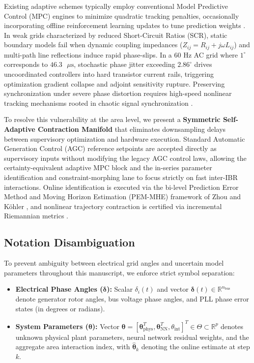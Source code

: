 \documentclass[journal]{IEEEtran}
\begin{document}
Existing adaptive schemes typically employ conventional Model Predictive Control (MPC) engines to minimize quadratic tracking penalties, occasionally incorporating offline reinforcement learning updates to tune prediction weights \cite{sasfi23, yameen26}. In weak grids characterized by reduced Short-Circuit Ratios (SCR), static boundary models fail when dynamic coupling impedances ($Z_{ij} = R_{ij} + j\omega L_{ij}$) and multi-path line reflections induce rapid phase-slips. In a $60\text{ Hz}$ AC grid where $1^\circ$ corresponds to $46.3\text{ }\mu\text{s}$, stochastic phase jitter exceeding $2.86^\circ$ drives uncoordinated controllers into hard transistor current rails, triggering optimization gradient collapse and adjoint sensitivity rupture. Preserving synchronization under severe phase distortion requires high-speed nonlinear tracking mechanisms rooted in chaotic signal synchronization \cite{gullicksen92}.

To resolve this vulnerability at the area level, we present a \textbf{Symmetric Self-Adaptive Contraction Manifold} that eliminates downsampling delays between supervisory optimization and hardware execution. Standard Automatic Generation Control (AGC) reference setpoints are accepted directly as supervisory inputs without modifying the legacy AGC control laws, allowing the certainty-equivalent adaptive MPC block \cite{kohler26} and the in-series parameter identification and constraint-morphing lane to focus strictly on fast inter-IBR interactions. Online identification is executed via the bi-level Prediction Error Method and Moving Horizon Estimation (PEM-MHE) framework of Zhou and K\"ohler \cite{zhou24}, and nonlinear trajectory contraction is certified via incremental Riemannian metrics \cite{lohmiller99}.

\subsection{Notation Disambiguation}
To prevent ambiguity between electrical grid angles and uncertain model parameters throughout this manuscript, we enforce strict symbol separation:
\begin{itemize}
    \item \textbf{Electrical Phase Angles ($\bm{\delta}$):} Scalar $\delta_i(t)$ and vector $\bm{\delta}(t) \in \mathbb{R}^{n_{\text{bus}}}$ denote generator rotor angles, bus voltage phase angles, and PLL phase error states (in degrees or radians).
    \item \textbf{System Parameters ($\bm{\theta}$):} Vector $\bm{\theta} = [\bm{\theta}_{\text{phys}}^T, \bm{\theta}_{\text{NN}}^T, \theta_{\text{int}}]^T \in \Theta \subset \mathbb{R}^p$ denotes unknown physical plant parameters, neural network residual weights, and the aggregate area interaction index, with $\hat{\bm{\theta}}_k$ denoting the online estimate at step $k$.
\end{itemize}
\end{document}

